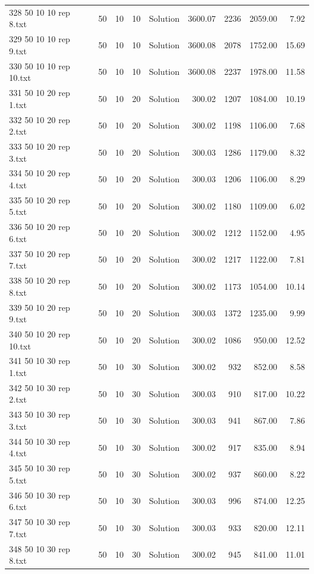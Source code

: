 \begin{longtable}{lrrllrrrr}
328 50 10 10 rep 8.txt & 50 & 10 & 10 & Solution & 3600.07 & 2236 & 2059.00 &  7.92\\
329 50 10 10 rep 9.txt & 50 & 10 & 10 & Solution & 3600.08 & 2078 & 1752.00 & 15.69\\
330 50 10 10 rep 10.txt & 50 & 10 & 10 & Solution & 3600.08 & 2237 & 1978.00 & 11.58\\
331 50 10 20 rep 1.txt & 50 & 10 & 20 & Solution & 300.02 & 1207 & 1084.00 & 10.19\\
332 50 10 20 rep 2.txt & 50 & 10 & 20 & Solution & 300.02 & 1198 & 1106.00 &  7.68\\
333 50 10 20 rep 3.txt & 50 & 10 & 20 & Solution & 300.03 & 1286 & 1179.00 &  8.32\\
334 50 10 20 rep 4.txt & 50 & 10 & 20 & Solution & 300.03 & 1206 & 1106.00 &  8.29\\
335 50 10 20 rep 5.txt & 50 & 10 & 20 & Solution & 300.02 & 1180 & 1109.00 &  6.02\\
336 50 10 20 rep 6.txt & 50 & 10 & 20 & Solution & 300.02 & 1212 & 1152.00 &  4.95\\
337 50 10 20 rep 7.txt & 50 & 10 & 20 & Solution & 300.02 & 1217 & 1122.00 &  7.81\\
338 50 10 20 rep 8.txt & 50 & 10 & 20 & Solution & 300.02 & 1173 & 1054.00 & 10.14\\
339 50 10 20 rep 9.txt & 50 & 10 & 20 & Solution & 300.03 & 1372 & 1235.00 &  9.99\\
340 50 10 20 rep 10.txt & 50 & 10 & 20 & Solution & 300.02 & 1086 & 950.00 & 12.52\\
341 50 10 30 rep 1.txt & 50 & 10 & 30 & Solution & 300.02 & 932 & 852.00 &  8.58\\
342 50 10 30 rep 2.txt & 50 & 10 & 30 & Solution & 300.03 & 910 & 817.00 & 10.22\\
343 50 10 30 rep 3.txt & 50 & 10 & 30 & Solution & 300.03 & 941 & 867.00 &  7.86\\
344 50 10 30 rep 4.txt & 50 & 10 & 30 & Solution & 300.02 & 917 & 835.00 &  8.94\\
345 50 10 30 rep 5.txt & 50 & 10 & 30 & Solution & 300.02 & 937 & 860.00 &  8.22\\
346 50 10 30 rep 6.txt & 50 & 10 & 30 & Solution & 300.03 & 996 & 874.00 & 12.25\\
347 50 10 30 rep 7.txt & 50 & 10 & 30 & Solution & 300.03 & 933 & 820.00 & 12.11\\
348 50 10 30 rep 8.txt & 50 & 10 & 30 & Solution & 300.02 & 945 & 841.00 & 11.01\\

\end{longtable}
